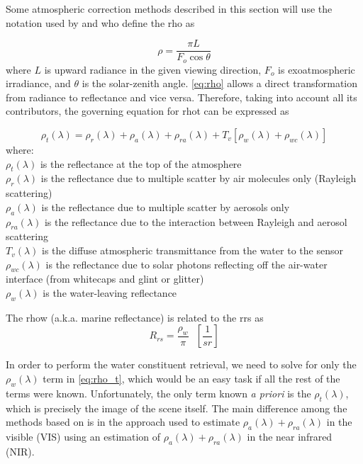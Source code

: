 Some atmospheric correction methods described in this section will use the notation used by \citet{Gordon:1994} and \citet{Ruddick:2000bs} who define the \gls{rho} as 

\begin{equation}\label{eq:rho}
  \rho = \frac{\pi L}{F_o \cos{\theta}}
\end{equation}
where $L$ is upward radiance in the given viewing direction, $F_o$ is exoatmospheric irradiance, and $\theta$ is the solar-zenith angle. \autoref{eq:rho} allows a direct transformation from radiance to reflectance and vice versa. Therefore, taking into account all its contributors, the governing equation for \gls{rhot} can be expressed as

\begin{equation}\label{eq:rho_t}
  \rho_t(\lambda) = \rho_r(\lambda) + \rho_a(\lambda) + \rho_{ra}(\lambda) + T_v[\rho_w(\lambda) + \rho_{wc}(\lambda)]
\end{equation}
where:\\
\indent $\rho_t(\lambda)$ is the reflectance at the top of the atmosphere \\
\indent $\rho_r(\lambda)$ is the reflectance due to multiple scatter by air molecules only (Rayleigh scattering)\\
\indent $\rho_a(\lambda)$ is the reflectance due to multiple scatter by aerosols only\\
\indent $\rho_{ra}(\lambda)$ is the reflectance due to the interaction between Rayleigh and aerosol scattering\\
\indent $T_v(\lambda)$ is the diffuse atmospheric transmittance from the water to the sensor\\
\indent $\rho_{wc}(\lambda)$ is the reflectance due to solar photons reflecting off the air-water interface (from whitecaps and glint or glitter)\\
\indent $\rho_w(\lambda)$ is the water-leaving reflectance

The \acrfull{rhow} (a.k.a. marine reflectance) is related to the \acrfull{rrs} as
\begin{equation}\label{eq:Rrs_And_rhow}
 R_{rs} = \frac{\rho_w}{\pi}~~~\left[\frac{1}{sr}\right]
\end{equation}

In order to perform the water constituent retrieval, we need to solve for only the $\rho_w(\lambda)$ term in \autoref{eq:rho_t}, which would be an easy task if all the rest of the terms were known. Unfortunately, the only term known {\it a priori} is the $\rho_t(\lambda)$, which is precisely the image of the scene itself. The main difference among the methods based on \citet{Gordon:1994} is in the approach used to estimate $\rho_a(\lambda) + \rho_{ra}(\lambda)$ in the visible (VIS) using an estimation of $\rho_a(\lambda) + \rho_{ra}(\lambda)$ in the near infrared (NIR).

